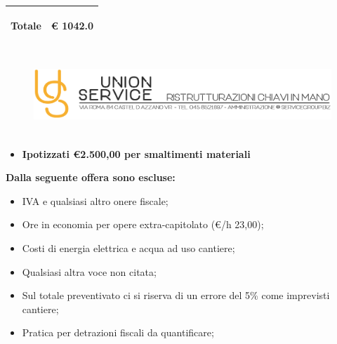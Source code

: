 \documentclass[a4paper]{article}
\begin{document}
                                                        \noindent\begin{tabular}{|L{133.1mm} |  L{16mm}| }
                                                        \hline
                                                          \vspace{2.5mm}
                                                          \begin{spacing}{0}
                                                            \textbf{Totale}
                                                          \end{spacing} &
                                                        \vspace{2.5mm}
                                                        \begin{spacing}{0}
                                                          \euro\hfill
                                                     1042.0
                                                        \end{spacing}\\
                                                        \hline
                                                        \end{tabular}
                               \newpage
                            \begin{figure}[!t]
                            \includegraphics[width=15.8cm, height=3cm]{intestazioneAlta2.jpg}
                            \end{figure}
                         
                        \begin{itemize}
                            \item \textbf{Ipotizzati \euro 2.500,00 per smaltimenti materiali}
                        \end{itemize}

                        \noindent\textbf{Dalla seguente offera sono escluse:}
                        \begin{itemize}
                            \item IVA e qualsiasi altro onere fiscale;
                            \item Ore in economia per opere extra-capitolato (\euro/h 23,00);
                            \item Costi di energia elettrica e acqua ad uso cantiere;
                            \item Qualsiasi altra voce non citata;
                            \item Sul totale preventivato ci si riserva di un errore del 5\% come imprevisti cantiere;
                            \item Pratica per detrazioni fiscali da quantificare;
                        \end{itemize}
\end{document}
